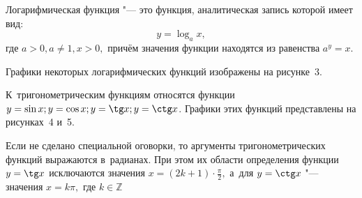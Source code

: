 Логарифмическая функция "--- это функция, аналитическая запись которой
имеет вид:
\begin{equation*}
y = \log_{a} x,
\end{equation*}
где $a > 0, a \ne 1, x > 0,$ причём значения функции находятся из равенства
$\displaystyle a^{y} = x$.

Графики некоторых логарифмических функций изображены на рисунке~3.

\begin{figure}
\end{figure}

К~тригонометрическим функциям относятся функции 
$y = \sin x; y = \cos x; y = \tg x; y = \ctg x$.
Графики этих функций представлены на рисунках~4 и~5.

\begin{Note}
Если не сделано специальной оговорки, то аргументы тригонометрических функций
выражаются в~радианах. При этом их области определения функции $y = \tg x$
исключаются значения $\displaystyle x = (2k +1) \cdot \frac{\pi}{2},$
а~для $y = \ctg x$ "--- значения $x = k\pi,$ где $k \in \mathbb{Z}$
\end{Note}
